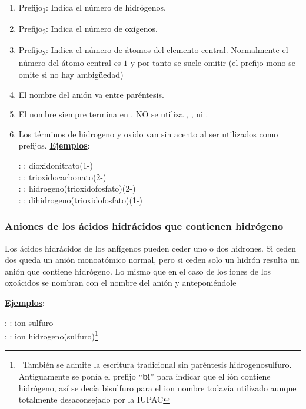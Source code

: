 \documentclass[12pt]{article}
\begin{document}
\begin{enumerate}
          \begin{enumerate}[label=\textcolor{red}{$\bullet$}]
              \item Prefijo\textsubscript{1}: Indica el número de hidrógenos.
              \item Prefijo\textsubscript{2}: Indica el número de oxígenos.
              \item Prefijo\textsubscript{3}: Indica el número de átomos del elemento central. Normalmente el número del átomo central es $1$ y por tanto se suele omitir (el prefijo mono se omite si no hay ambigüedad)
              \item El nombre del anión va entre paréntesis.
              \item El nombre siempre termina en . NO se utiliza , ,  ni .
              \item Los términos de hidrogeno y oxido van sin acento al ser utilizados como prefijos.
                    \textbf{\uline{Ejemplos}}:

                     :  : dioxidonitrato(1-)\\
                     : : trioxidocarbonato(2-) \\
                     : : hidrogeno(trioxidofosfato)(2-)\\
                     : : dihidrogeno(trioxidofosfato)(1-)

          \end{enumerate}


\end{enumerate}

\subsubsection{Aniones de los ácidos hidrácidos que contienen hidrógeno}

Los ácidos hidrácidos de los anfígenos pueden ceder uno o dos hidrones. Si ceden dos queda un anión monoatómico normal, pero si ceden solo un hidrón resulta un anión que contiene hidrógeno. Lo mismo que en el caso de los iones de los oxoácidos se nombran con el nombre del anión y anteponiéndole 

\textbf{\uline{Ejemplos}}:

\noindent {} :  : ion sulfuro \\
 :  : ion hidrogeno(sulfuro)\footnote{\ También se admite la escritura tradicional sin paréntesis hidrogenosulfuro. Antiguamente se ponía el prefijo “\textbf{bi}” para indicar que el ión contiene hidrógeno, así se decía bisulfuro para el ion  nombre todavía utilizado aunque totalmente desaconsejado por la IUPAC} \\
\end{document}
